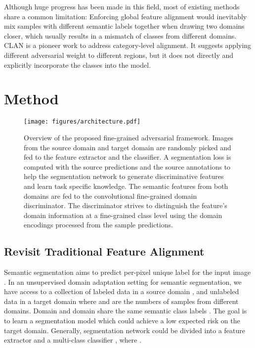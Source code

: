 \documentclass[runningheads]{llncs}
\begin{document}
Although huge progress has been made in this field, most of existing methods share a common limitation: Enforcing global feature alignment would inevitably mix samples with different semantic labels together when drawing two domains closer, which usually results in a mismatch of classes from different domains. CLAN \cite{Yawei2019Taking} is a pioneer work to address category-level alignment. It suggests applying different adversarial weight to different regions, but it does not directly and explicitly incorporate the classes into the model.

%
 
\section{Method}
\begin{figure}[t]
\centering
\texttt{[image: figures/architecture.pdf]}
   \caption{Overview of the proposed fine-grained adversarial framework. Images from the source domain and target domain are randomly picked and fed to the feature extractor and the classifier. A segmentation loss is computed with the source predictions and the source annotations to help the segmentation network to generate discriminative features and learn task specific knowledge. The semantic features from both domains are fed to the convolutional fine-grained domain discriminator. The discriminator strives to distinguish the feature's domain information at a fine-grained class level using the domain encodings processed from the sample predictions.}
   
\label{fig:architecture}
\end{figure}



\subsection{Revisit Traditional Feature Alignment}
Semantic segmentation aims to predict per-pixel unique label for the input image \cite{Shelhamer2017FCN}. 
In an unsupervised domain adaptation setting for semantic segmentation, we have access to a collection of labeled data  in a source domain , and unlabeled data  in a target domain  where  and  are the numbers of samples from different domains. Domain  and domain  share the same  semantic class labels .
The goal is to learn a segmentation model  which could achieve a low expected risk on the target domain. 
Generally, segmentation network  could be divided into a feature extractor  and a multi-class classifier , where . 
\end{document}
